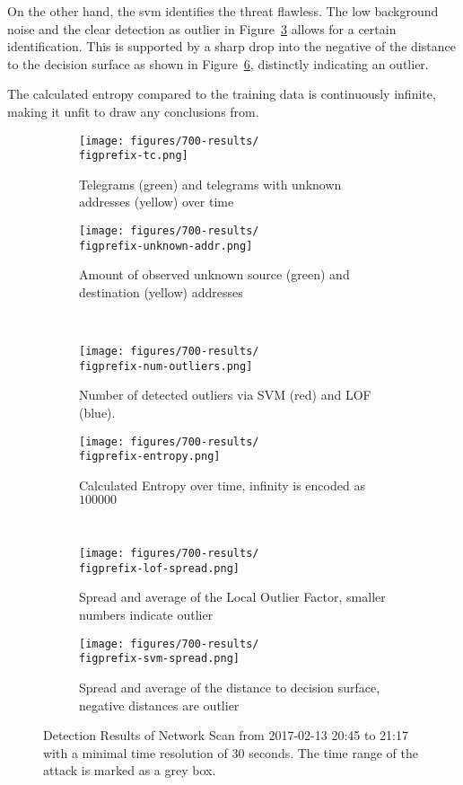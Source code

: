 On the other hand, the \gls{svm} identifies the threat flawless. The low background noise and the clear detection as outlier in Figure~\ref{fig:results:scan:outlier} allows for a certain identification. This is supported by a sharp drop into the negative of the distance to the decision surface as shown in Figure~\ref{fig:results:scan:svm}, distinctly indicating an outlier.

The calculated entropy compared to the training data is continuously infinite, making it unfit to draw any conclusions from.


\begin{figure}[H]
	\newcommand{\figwith}{0.49\textwidth}
	\newcommand{\figprefix}{scan}
	\centering
	
	\begin{subfigure}[b]{\figwith}
		\texttt{[image: figures/700-results/\\figprefix-tc.png]}
		\caption{Telegrams (green) and telegrams with unknown addresses (yellow) over time}
		\label{fig:results:\figprefix:tc}
	\end{subfigure}
	\hfil
	\begin{subfigure}[b]{\figwith}
		\texttt{[image: figures/700-results/\\figprefix-unknown-addr.png]}
		\caption{Amount of observed unknown source (green) and destination (yellow) addresses}
		\label{fig:results:\figprefix:addr}
	\end{subfigure}
	\\[1.5mm]
	\begin{subfigure}[b]{\figwith}
		\texttt{[image: figures/700-results/\\figprefix-num-outliers.png]}
		\caption{Number of detected outliers via SVM (red) and LOF (blue).}
		\label{fig:results:\figprefix:outlier}
	\end{subfigure}
	\hfil
	\begin{subfigure}[b]{\figwith}
		\texttt{[image: figures/700-results/\\figprefix-entropy.png]}
		\caption{Calculated Entropy over time, infinity is encoded as $100 000$}
		\label{fig:results:\figprefix:entropy}
	\end{subfigure}
	\\[1.5mm]
	\begin{subfigure}[b]{\figwith}
		\texttt{[image: figures/700-results/\\figprefix-lof-spread.png]}
		\caption{Spread and average of the Local Outlier Factor, smaller numbers indicate outlier}
		\label{fig:results:\figprefix:lof}
	\end{subfigure}
	\hfil
	\begin{subfigure}[b]{\figwith}
		\texttt{[image: figures/700-results/\\figprefix-svm-spread.png]}
		\caption{Spread and average of the distance to decision surface, negative distances are outlier}
		\label{fig:results:\figprefix:svm}
	\end{subfigure}
	
	\caption[Detection Results of a Network Scan]{Detection Results of Network Scan from 2017-02-13 20:45 to 21:17 with a minimal time resolution of 30 seconds. The time range of the attack is marked as a grey box.}
	\label{fig:results:\figprefix}
	
\end{figure}

